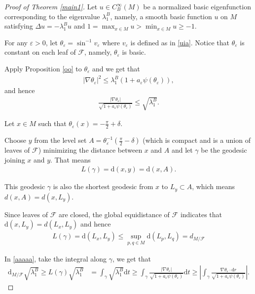 \documentclass[10pt,a4paper]{amsart}
\def\d{\mathrm{d}}
\begin{document}
        \begin{proof}[Proof of Theorem \ref{main1}]

        Let $u\in C^\infty_B(M)$ be a normalized basic eigenfunction corresponding to the eigenvalue $\lambda_1^B$, namely, a smooth basic function $u$ on $M$ satisfying $\Delta u=-\lambda_1^B u$ and $1=\max_{x\in M} u>\min _{x\in M}u\geq -1$. 

        For any $\varepsilon>0$, let $\theta_\varepsilon=\sin^{-1}v_\varepsilon$ where $v_\varepsilon$ is defined as in \ref{uia}. Notice that $\theta_\varepsilon$ is constant on each leaf of $\mathcal{F}$, namely, $\theta_\varepsilon$ is basic.
        
        Apply Proposition \ref{oo} to $\theta_\varepsilon$ and we get that
        \begin{align}\label{uiia}
            \vert\nabla\theta_\varepsilon\vert^2\leq\lambda_1^B(1+a_\varepsilon\psi(\theta_\varepsilon)),
        \end{align} and hence
        \begin{align}
            \label{aaaaa}\frac{\vert\nabla\theta_\varepsilon\vert}{\sqrt{1+a_\varepsilon\psi(\theta_\varepsilon)}}\leq\sqrt{\lambda_1^B}.
        \end{align}

        Let $x\in M$ such that $\theta_\varepsilon(x)=-\frac{\pi}{2}+\delta$.

        
        Choose $y$ from the level set $A=\theta_\varepsilon^{-1}(\frac{\pi}{2}-\delta)$ (which is compact and is a union of leaves of $\mathcal{F}$) minimizing the distance between $x$ and $A$ and let $\gamma
        $ be the geodesic joining $x$ and $y$. That means
        \begin{align}
            L(\gamma)=\d(x,y)=\d(x,A).
        \end{align}

        This geodesic $\gamma$ is also the shortest geodesic from $x$ to $L_y\subset A$, which means $d(x,A)=d(x,L_y)$.

        Since leaves of $\mathcal{F}$ are closed, the global equidistance of $\mathcal{F}$ indicates that $\d(x,L_y)=d(L_x,L_y)$ and hence
        \begin{align}
            L(\gamma)=\d(L_x,L_y)\leq\sup_{p,q\in M}\d(L_p,L_q)=d_{M/\mathcal{F}}
        \end{align}

        In \ref{aaaaa}, take the integral along $\gamma$, we get that
        \begin{align}\label{sf}
            \d_{M/\mathcal{F}}\sqrt{\lambda_1^B}\geq L(\gamma)\sqrt{\lambda_1^B}&=\int_\gamma{\sqrt{\lambda_1^B }\d t}\geq\int_\gamma\frac{\vert\nabla\theta_\varepsilon\vert}{\sqrt{1+a_\varepsilon\psi(\theta_\varepsilon)}} \d t\geq\left\vert\int_\gamma{\frac{\nabla\theta_\varepsilon\cdot \d r}{\sqrt{1+a_\varepsilon\psi(\theta_\varepsilon)}}}\right\vert.
        \end{align}


\end{proof}
\end{document}
